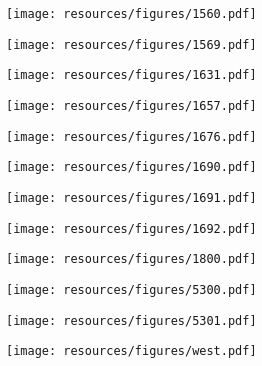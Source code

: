\begin{figure}[h]
\centering
\texttt{[image: resources/figures/1560.pdf]}
\label{fig:appendix_1560}
\end{figure}

\begin{figure}[h]
\centering
\texttt{[image: resources/figures/1569.pdf]}
\label{fig:appendix_1569}
\end{figure}

\begin{figure}[h]
\centering
\texttt{[image: resources/figures/1631.pdf]}
\label{fig:appendix_1631}
\end{figure}

\begin{figure}[h]
\centering
\texttt{[image: resources/figures/1657.pdf]}
\label{fig:appendix_1657}
\end{figure}

\begin{figure}[h]
\centering
\texttt{[image: resources/figures/1676.pdf]}
\label{fig:appendix_1676}
\end{figure}

\begin{figure}[h]
\centering
\texttt{[image: resources/figures/1690.pdf]}
\label{fig:appendix_1690}
\end{figure}

\begin{figure}[h]
\centering
\texttt{[image: resources/figures/1691.pdf]}
\label{fig:appendix_1691}
\end{figure}

\begin{figure}[h]
\centering
\texttt{[image: resources/figures/1692.pdf]}
\label{fig:appendix_1692}
\end{figure}

\begin{figure}[h]
\centering
\texttt{[image: resources/figures/1800.pdf]}
\label{fig:appendix_1800}
\end{figure}

\begin{figure}[h]
\centering
\texttt{[image: resources/figures/5300.pdf]}
\label{fig:appendix_5300}
\end{figure}

\begin{figure}[h]
\centering
\texttt{[image: resources/figures/5301.pdf]}
\label{fig:appendix_5301}
\end{figure}

\begin{figure}[h]
\centering
\texttt{[image: resources/figures/west.pdf]}
\label{fig:appendix_west}
\end{figure}
